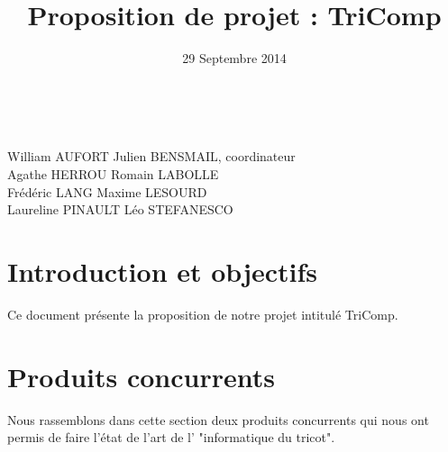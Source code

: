 \documentclass{article}
\title{Proposition de projet : TriComp}
\author{}
\date{29 Septembre 2014}
\begin{document}
\makeatletter %
  \begin{titlepage}
    \begin{center}
       {\LARGE \@title} \\
       \vspace{1cm}
       {\large \@date}
       \vspace{2cm}       
    \end{center}
       {\large
       William AUFORT \hfill Julien BENSMAIL, coordinateur\\
       Agathe HERROU  \hfill Romain LABOLLE \\
       Frédéric LANG \hfill Maxime LESOURD \\
       Laureline PINAULT \hfill Léo STEFANESCO \\}
  \tableofcontents          
  \end{titlepage}
\makeatother

\pagebreak

%



\section{Introduction et objectifs}

Ce document présente la proposition de notre projet intitulé TriComp.


\section{Produits concurrents}

Nous rassemblons dans cette section deux produits concurrents qui nous ont permis de faire l'état de l'art de l' "informatique du tricot".
\end{document}
